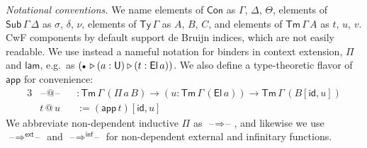 \documentclass{article}
\makeatletter
\theoremstyle{definition}
\theoremstyle{theorem}
\newcommand{\id}{\mathsf{id}}
\newcommand{\Con}{\mathsf{Con}}
\newcommand{\Sub}{\mathsf{Sub}}
\newcommand{\Tm}{\mathsf{Tm}}
\newcommand{\Ty}{\mathsf{Ty}}
\newcommand{\U}{\mathsf{U}}
\newcommand{\El}{\mathsf{El}}
\newcommand{\blank}{\mathord{\hspace{1pt}\text{--}\hspace{1pt}}}
\newcommand{\ra}{\rightarrow}
\newcommand{\ext}{\triangleright}
\newcommand{\emptycon}{\scaleobj{.75}\bullet}
\newcommand{\Pii}{\Pi}
\newcommand{\appi}{\mathsf{app}}
\newcommand{\lami}{\mathsf{lam}}
\newcommand{\Pie}{\Pi^{\mathsf{ext}}}
\newcommand{\Piinf}{\Pi^{\mathsf{inf}}}
\newcommand{\appitt}{\mathop{{\scriptstyle @}}}
\newcommand{\p}{\mathsf{p}}
\newcommand{\arri}{\Rightarrow}
\newcommand{\arre}{\Rightarrow^{\mathsf{ext}}}
\newcommand{\arrinf}{\Rightarrow^{\mathsf{inf}}}
\makeatother
\begin{document}
\emph{Notational conventions.} We name elements of $\Con$ as $\Gamma$, $\Delta$,
$\Theta$, elements of $\Sub\,\Gamma\,\Delta$ as $\sigma$, $\delta$, $\nu$,
elements of $\Ty\,\Gamma$ as $A$, $B$, $C$, and elements of $\Tm\,\Gamma\,A$ as
$t$, $u$, $v$. CwF components by default support de Bruijn indices, which are
not easily readable. We use instead a nameful notation for binders in context
extension, $\Pii$ and $\lami$, e.g.\ as $(\emptycon\,\ext (a : \U) \ext (t :
\El\,a))$. We also define a type-theoretic flavor of $\appi$ for convenience:
\begin{alignat*}{3}
  & \blank\appitt\blank && :
      \Tm\,\Gamma\,(\Pii\,a\,B)\ra
      (u : \Tm\,\Gamma\,(\El\,a)) \ra \Tm\,\Gamma\,(B[\id, u])\\
  & t\appitt u && := (\appi\,t)[\id, u]
\end{alignat*}
We abbreviate non-dependent inductive $\Pii$ as $\blank\arri\blank$, and
likewise we use $\blank\arre\blank$ and $\blank\arrinf\blank$ for non-dependent
external and infinitary functions.

\end{document}
